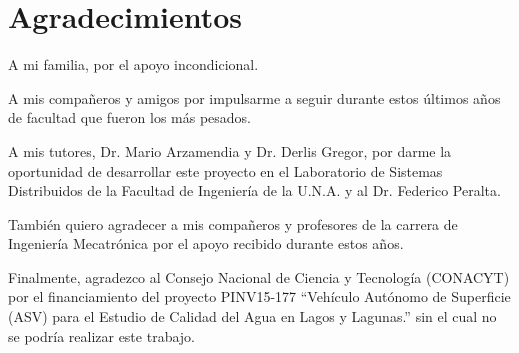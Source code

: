 \vspace{2cm}
\chapter*{Agradecimientos}

\pagestyle{fancy}
\vspace{-10mm}

\hspace{12pt}

A mi familia, por el apoyo incondicional. 

A mis compañeros y amigos por impulsarme a seguir durante  estos últimos años de facultad que fueron los más pesados.

A mis tutores, Dr. Mario Arzamendia y  Dr. Derlis Gregor, por darme la oportunidad de desarrollar este proyecto en el Laboratorio de Sistemas Distribuidos de la Facultad de Ingeniería de la U.N.A. y al Dr. Federico Peralta.

También quiero agradecer a mis compañeros y profesores de la carrera de Ingeniería Mecatrónica por el apoyo recibido durante estos años.

Finalmente, agradezco al Consejo Nacional de Ciencia y Tecnología (CONACYT) por el financiamiento del proyecto PINV15-177 “Vehículo Autónomo de Superficie (ASV) para el Estudio de Calidad del Agua en Lagos y Lagunas.” sin el cual no se podría realizar este trabajo. 

\bigskip



